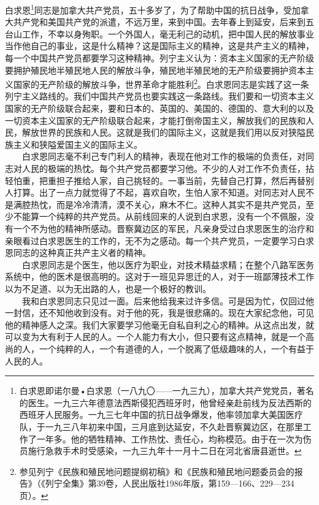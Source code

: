 \documentclass[cn,11pt,chinese]{elegantbook}
\begin{document}
白求恩\footnote[1]{ 白求恩即诺尔曼•白求恩（一八九〇——一九三九），加拿大共产党党员，著名的医生。一九三六年德意法西斯侵犯西班牙时，他曾经亲赴前线为反法西斯的西班牙人民服务。一九三七年中国的抗日战争爆发，他率领加拿大美国医疗队，于一九三八年初来中国，三月底到达延安，不久赴晋察冀边区，在那里工作了一年多。他的牺牲精神、工作热忱、责任心，均称模范。由于在一次为伤员施行急救手术时受感染，一九三九年十一月十二日在河北省唐县逝世。}同志是加拿大共产党员，五十多岁了，为了帮助中国的抗日战争，受加拿大共产党和美国共产党的派遣，不远万里，来到中国。去年春上到延安，后来到五台山工作，不幸以身殉职。一个外国人，毫无利己的动机，把中国人民的解放事业当作他自己的事业，这是什么精神？这是国际主义的精神，这是共产主义的精神，每一个中国共产党员都要学习这种精神。列宁主义认为：资本主义国家的无产阶级要拥护殖民地半殖民地人民的解放斗争，殖民地半殖民地的无产阶级要拥护资本主义国家的无产阶级的解放斗争，世界革命才能胜利\footnote[2]{ 参见列宁《民族和殖民地问题提纲初稿》和《民族和殖民地问题委员会的报告》（《列宁全集》第39卷，人民出版社1986年版，第159—166、229—234页）。}。白求恩同志是实践了这一条列宁主义路线的。我们中国共产党员也要实践这一条路线。我们要和一切资本主义国家的无产阶级联合起来，要和日本的、英国的、美国的、德国的、意大利的以及一切资本主义国家的无产阶级联合起来，才能打倒帝国主义，解放我们的民族和人民，解放世界的民族和人民。这就是我们的国际主义，这就是我们用以反对狭隘民族主义和狭隘爱国主义的国际主义。\\
　　白求恩同志毫不利己专门利人的精神，表现在他对工作的极端的负责任，对同志对人民的极端的热忱。每个共产党员都要学习他。不少的人对工作不负责任，拈轻怕重，把重担子推给人家，自己挑轻的。一事当前，先替自己打算，然后再替别人打算。出了一点力就觉得了不起，喜欢自吹，生怕人家不知道。对同志对人民不是满腔热忱，而是冷冷清清，漠不关心，麻木不仁。这种人其实不是共产党员，至少不能算一个纯粹的共产党员。从前线回来的人说到白求恩，没有一个不佩服，没有一个不为他的精神所感动。晋察冀边区的军民，凡亲身受过白求恩医生的治疗和亲眼看过白求恩医生的工作的，无不为之感动。每一个共产党员，一定要学习白求恩同志的这种真正共产主义者的精神。\\
　　白求恩同志是个医生，他以医疗为职业，对技术精益求精；在整个八路军医务系统中，他的医术是很高明的。这对于一班见异思迁的人，对于一班鄙薄技术工作以为不足道、以为无出路的人，也是一个极好的教训。\\
　　我和白求恩同志只见过一面。后来他给我来过许多信。可是因为忙，仅回过他一封信，还不知他收到没有。对于他的死，我是很悲痛的。现在大家纪念他，可见他的精神感人之深。我们大家要学习他毫无自私自利之心的精神。从这点出发，就可以变为大有利于人民的人。一个人能力有大小，但只要有这点精神，就是一个高尚的人，一个纯粹的人，一个有道德的人，一个脱离了低级趣味的人，一个有益于人民的人。\\
\end{document}
